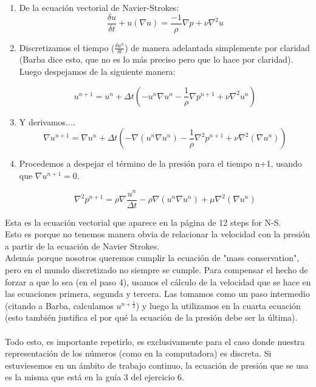\documentclass[a4paper]{article}
\begin{document}
\begin{enumerate}
\item De la ecuación vectorial de Navier-Strokes:
	$$ \frac{\delta u}{\delta t} + u(\nabla u) = \frac{-1}{\rho} \nabla p + \nu \nabla^{2}u$$

\item Discretizamos el tiempo ($\frac{\delta u^{n}}{\delta t}$) de manera adelantada simplemente por claridad (Barba dice esto, que no es lo más preciso pero que lo hace por claridad). Luego despejamos de la siguiente manera:

	$$u^{n+1} = u^{n} + \Delta t\left(-u^{n}\nabla u^{n} - \frac{1}{\rho}\nabla p^{n+1} + \nu\nabla^{2}u^{n}\right)$$ 

\item Y derivamos....
	$$\nabla u^{n+1} = \nabla u^{n} + \Delta t\left(-\nabla(u^{n}\nabla u^{n}) - \frac{1}{\rho}\nabla^{2} p^{n+1} + \nu\nabla^{2}(\nabla u^{n})\right)$$ 

\item Procedemos a despejar el término de la presión para el tiempo n+1, usando que $\nabla u^{n+1} = 0$.

	$$ \nabla^{2}p^{n+1} = \rho\nabla\frac{u^{n}}{\Delta t} - \rho\nabla\left(u^{n}\nabla u^{n}\right) + \mu\nabla^{2}\left(\nabla u^{n}\right)$$

\end{enumerate}

Esta es la ecuación vectorial que aparece en la página de 12 steps for N-S.\\
Esto es porque no tenemos manera obvia de relacionar la velocidad con la presión a partir de la ecuación de Navier Strokes.\\
Además porque nosotros queremos cumplir la ecuación de "mass conservation", pero en el mundo discretizado no siempre se cumple. Para compensar el hecho de forzar a que lo sea (en el paso 4), usamos el cálculo de la velocidad que se hace en las ecuaciones primera, segunda y tercera. Las tomamos como un paso intermedio (citando a Barba, calculamos $u^{n+\frac{1}{2}}$) y luego la utilizamos en la cuarta ecuación (esto también justifica el por qué la ecuación de la presión debe ser la última).\\
~\\
Todo esto, es importante repetirlo, es exclusivamente para el caso donde nuestra representación de los números (como en la computadora) es discreta. Si estuviesemos en un ámbito de trabajo continuo, la ecuación de presión que se usa es la misma que está en la guía 3 del ejercicio 6.


 
\end{document}
